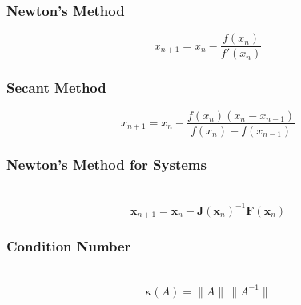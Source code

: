 \documentclass[11pt]{exam}
\newcommand{\ds}{\displaystyle}
\begin{document}




\subsubsection*{Newton's Method}
$$x_{n+1} = x_n - \dfrac{f(x_n)}{f'(x_n)}$$

\subsubsection*{Secant Method}
$$x_{n+1} = x_n - \dfrac{f(x_n) (x_n - x_{n-1})}{f(x_n) - f(x_{n-1})}$$


\subsubsection*{Newton's Method for Systems} ~
$$\mathbf{x}_{n+1} = \mathbf{x}_n - \mathbf{J}(\mathbf{x}_n)^{-1} \mathbf{F}(\mathbf{x}_n)$$

\subsubsection*{Condition Number} ~
$$\kappa(A) = \| A \| \, \|A^{-1} \|$$
\end{document}
